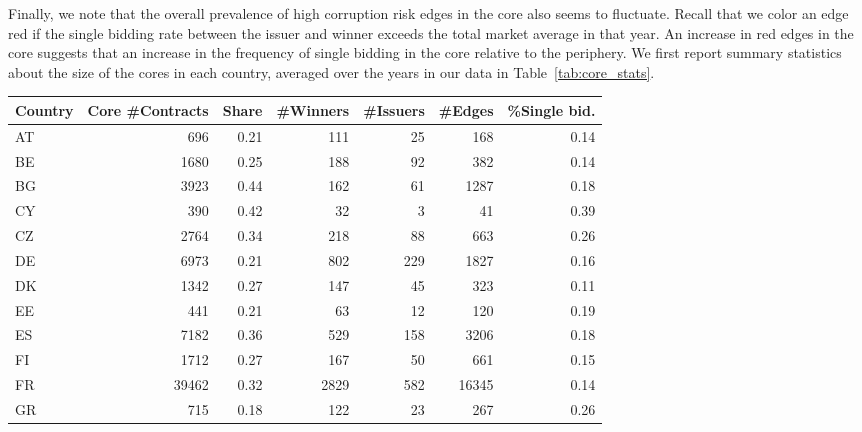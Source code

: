 Finally, we note that the overall prevalence of high corruption risk edges in the core also seems to fluctuate. Recall that we color an edge red if the single bidding rate between the issuer and winner exceeds the total market average in that year. An increase in red edges in the core suggests that an increase in the frequency of single bidding in the core relative to the periphery. We first report summary statistics about the size of the cores in each country, averaged over the years in our data in Table~\ref{tab:core_stats}. 

\begin{table}
\begin{tabular}{lrrrrrr}
\toprule
Country &  Core \#Contracts &  Share &  \#Winners &  \#Issuers &  \#Edges &  \%Single bid.  \\
\midrule
AT      &              696 &                 0.21 &            111 &             25 &          168 &          0.14 \\
BE      &             1680 &                 0.25 &            188 &             92 &          382 &          0.14 \\
BG      &             3923 &                 0.44 &            162 &             61 &         1287 &          0.18 \\
CY      &              390 &                 0.42 &             32 &              3 &           41 &          0.39 \\
CZ      &             2764 &                 0.34 &            218 &             88 &          663 &          0.26 \\
DE      &             6973 &                 0.21 &            802 &            229 &         1827 &          0.16 \\
DK      &             1342 &                 0.27 &            147 &             45 &          323 &          0.11 \\
EE      &              441 &                 0.21 &             63 &             12 &          120 &          0.19 \\
ES      &             7182 &                 0.36 &            529 &            158 &         3206 &          0.18 \\
FI      &             1712 &                 0.27 &            167 &             50 &          661 &          0.15 \\
FR      &            39462 &                 0.32 &           2829 &            582 &        16345 &          0.14 \\
GR      &              715 &                 0.18 &            122 &             23 &          267 &          0.26 \\

\end{tabular}
\end{table}
